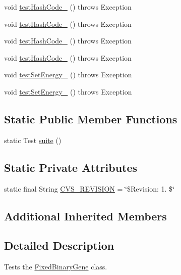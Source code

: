 \begin{DoxyCompactItemize}
\item 
void \hyperlink{classorg_1_1jgap_1_1impl_1_1_fixed_binary_gene_test_a7664b9a8cb84c4a3cc420ef9aef5b81b}{test\-Hash\-Code\-\_} ()  throws Exception 
\item 
void \hyperlink{classorg_1_1jgap_1_1impl_1_1_fixed_binary_gene_test_a4b1d38cef38c4e3c543b89514fc079e2}{test\-Hash\-Code\-\_} ()  throws Exception 
\item 
void \hyperlink{classorg_1_1jgap_1_1impl_1_1_fixed_binary_gene_test_a2e76f067d0f2d81cf929ab577262d45f}{test\-Hash\-Code\-\_} ()  throws Exception 
\item 
void \hyperlink{classorg_1_1jgap_1_1impl_1_1_fixed_binary_gene_test_ab29a6dc85f651f83649c5add898f8716}{test\-Hash\-Code\-\_} ()  throws Exception 
\item 
void \hyperlink{classorg_1_1jgap_1_1impl_1_1_fixed_binary_gene_test_a99a259cba3e8c0479ced236c6291e3c3}{test\-Set\-Energy\-\_} ()  throws Exception 
\item 
void \hyperlink{classorg_1_1jgap_1_1impl_1_1_fixed_binary_gene_test_af904ed8c4f128dfcab908d1a751b2c59}{test\-Set\-Energy\-\_} ()  throws Exception 
\end{DoxyCompactItemize}
\subsection*{Static Public Member Functions}
\begin{DoxyCompactItemize}
\item 
static Test \hyperlink{classorg_1_1jgap_1_1impl_1_1_fixed_binary_gene_test_a917ff5e5aeb1fa9eab7af133cb4e3f21}{suite} ()
\end{DoxyCompactItemize}
\subsection*{Static Private Attributes}
\begin{DoxyCompactItemize}
\item 
static final String \hyperlink{classorg_1_1jgap_1_1impl_1_1_fixed_binary_gene_test_ab8e3d581b0d68da946dd457539682c07}{C\-V\-S\-\_\-\-R\-E\-V\-I\-S\-I\-O\-N} = \char`\"{}\$Revision\-: 1. \$\char`\"{}
\end{DoxyCompactItemize}
\subsection*{Additional Inherited Members}


\subsection{Detailed Description}
Tests the \hyperlink{classorg_1_1jgap_1_1impl_1_1_fixed_binary_gene}{Fixed\-Binary\-Gene} class.

